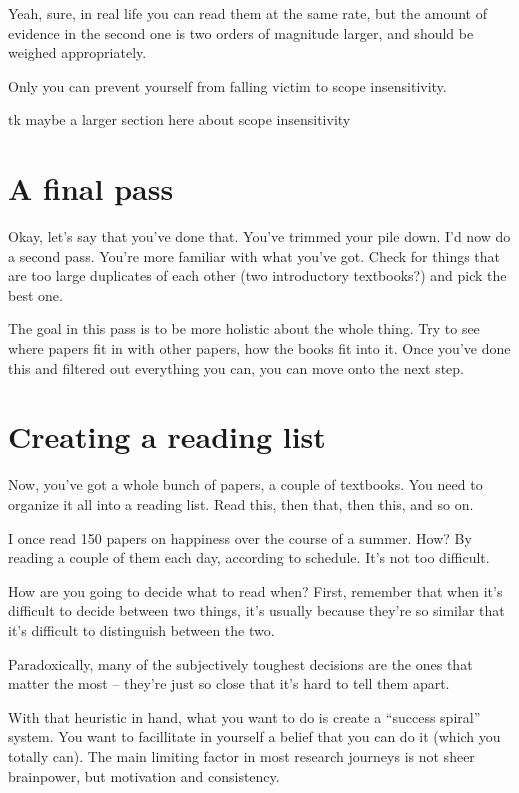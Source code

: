 Yeah, sure, in real life you can read them at the same rate, but the amount of
evidence in the second one is two orders of magnitude larger, and should be
weighed appropriately.

Only you can prevent yourself from falling victim to scope insensitivity.

tk maybe a larger section here about scope insensitivity

\section{A final pass}

Okay, let's say that you've done that. You've trimmed your pile down. I'd now do
a second pass. You're more familiar with what you've got. Check for things that
are too large duplicates of each other (two introductory textbooks?) and pick
the best one.

The goal in this pass is to be more holistic about the whole thing. Try to see
where papers fit in with other papers, how the books fit into it. Once you've
done this and filtered out everything you can, you can move onto the next step.

\section{Creating a reading list}

Now, you've got a whole bunch of papers, a couple of textbooks. You need to
organize it all into a reading list. Read this, then that, then this, and so on.

I once read 150 papers on happiness over the course of a summer. How? By reading
a couple of them each day, according to schedule. It's not too difficult.

 How are you going to decide what to read when? First, remember that
when it's difficult to decide between two things, it's usually because they're
so similar that it's difficult to distinguish between the two.

Paradoxically, many of the subjectively toughest decisions are the ones that
matter the most -- they're just so close that it's hard to tell them apart.

With that heuristic in hand, what you want to do is create a ``success spiral''
system. You want to facillitate in yourself a belief that you can do it (which
you totally can). The main limiting factor in most research journeys is not
sheer brainpower, but motivation and consistency.

